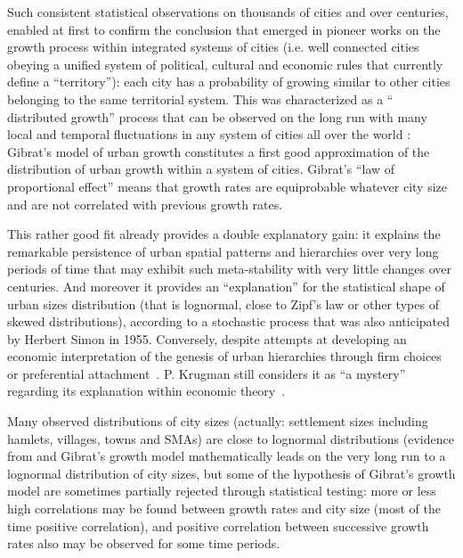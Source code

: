 \documentclass[11pt]{article}
\begin{document}
Such consistent statistical observations on thousands of cities and over centuries, enabled at first to confirm the conclusion that emerged in pioneer works on the growth process within integrated systems of cities (i.e. well connected cities obeying a unified system of political, cultural and economic rules that currently define a ``territory''): each city has a probability of growing similar to other cities belonging to the same territorial system. This was characterized as a `` distributed growth'' process that can be observed on the long run with many local and temporal fluctuations in any system of cities all over the world \cite{gibrat1931ingalits,robson1973view,pumain1982dynamique}: Gibrat’s model of urban growth constitutes a first good approximation of the distribution of urban growth within a system of cities. Gibrat's ``law of proportional effect'' means that growth rates are equiprobable whatever city size and are not correlated with previous growth rates. 


This rather good fit already provides a double explanatory gain: it explains the remarkable persistence of urban spatial patterns and hierarchies over very long periods of time that may exhibit such meta-stability with very little changes over centuries. And moreover it provides an ``explanation'' for the statistical shape of urban sizes distribution (that is lognormal, close to Zipf’s law or other types of skewed distributions), according to a stochastic process that was also anticipated by Herbert Simon in 1955. Conversely, despite attempts at developing an economic interpretation of the genesis of urban hierarchies through firm choices or preferential attachment~\cite{gabaix1999zipf}. P. Krugman still considers it as ``a mystery'' regarding its explanation within economic theory~\cite{krugman1996confronting}.

Many observed distributions of city sizes (actually: settlement sizes including hamlets, villages, towns and SMAs) are close to lognormal distributions (evidence from \cite{robson1973view,pumain1982dynamique,eeckhout2004gibrat,decker2007global} and Gibrat's growth model mathematically leads on the very long run to a lognormal distribution of city sizes, but some of the hypothesis of Gibrat's growth model are sometimes partially rejected through statistical testing: more or less high correlations may be found between growth rates and city size (most of the time positive correlation), and positive correlation between successive growth rates also may be observed for some time periods.
\end{document}
